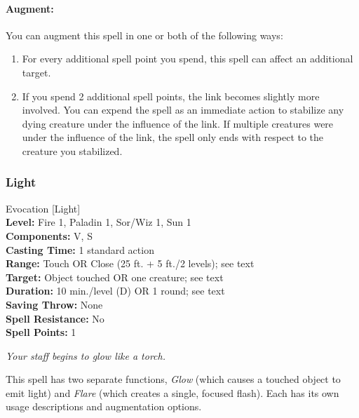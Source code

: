 \paragraph{Augment:} You can augment this spell in one or both of the following ways:
\begin{enumerate}
 \item For every additional spell point you spend, this spell can affect an additional target.
 \item If you spend 2 additional spell points, the link becomes slightly more involved. You can expend the spell as an immediate action to stabilize any dying creature under the influence of the link. If multiple creatures were under the influence of the link, the spell only ends with respect to the creature you stabilized.
\end{enumerate}

\subsubsection{Light}
\label{Spell:Light}
Evocation [Light]
\\ \textbf{Level:} Fire 1, Paladin 1, Sor/Wiz 1, Sun 1
\\ \textbf{Components:} V, S
\\ \textbf{Casting Time:} 1 standard action
\\ \textbf{Range:} Touch OR Close (25 ft. + 5 ft./2 levels); see text
\\ \textbf{Target:} Object touched OR one creature; see text
\\ \textbf{Duration:} 10 min./level (D) OR 1 round; see text
\\ \textbf{Saving Throw:} None
\\ \textbf{Spell Resistance:} No
\\ \textbf{Spell Points:} 1

\emph{Your staff begins to glow like a torch.}

This spell has two separate functions, \emph{Glow} (which causes a touched object to emit light) 
and \emph{Flare} (which creates a single, focused flash).
Each has its own usage descriptions and augmentation options.

